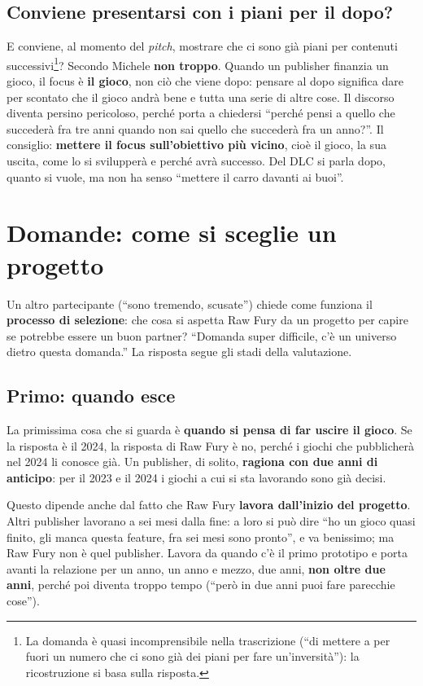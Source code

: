 \subsection{Conviene presentarsi con i piani per il dopo?}

E conviene, al momento del \emph{pitch}, mostrare che ci sono già piani per
contenuti successivi\footnote{La domanda è quasi incomprensibile nella
trascrizione (``di mettere a per fuori un numero che ci sono già dei piani per
fare un'inversità''): la ricostruzione si basa sulla risposta.}? Secondo Michele
\textbf{non troppo}. Quando un publisher finanzia un gioco, il focus è
\textbf{il gioco}, non ciò che viene dopo: pensare al dopo significa dare per
scontato che il gioco andrà bene e tutta una serie di altre cose. Il discorso
diventa persino pericoloso, perché porta a chiedersi ``perché pensi a quello che
succederà fra tre anni quando non sai quello che succederà fra un anno?''. Il
consiglio: \textbf{mettere il focus sull'obiettivo più vicino}, cioè il gioco, la
sua uscita, come lo si svilupperà e perché avrà successo. Del DLC si parla
dopo, quanto si vuole, ma non ha senso ``mettere il carro davanti ai buoi''.

\section{Domande: come si sceglie un progetto}
\label{sec:z4-qa-selezione}

Un altro partecipante (``sono tremendo, scusate'') chiede come funziona il
\textbf{processo di selezione}: che cosa si aspetta Raw Fury da un progetto per
capire se potrebbe essere un buon partner? ``Domanda super difficile, c'è un
universo dietro questa domanda.'' La risposta segue gli stadi della valutazione.

\subsection{Primo: quando esce}

La primissima cosa che si guarda è \textbf{quando si pensa di far uscire il
gioco}. Se la risposta è il 2024, la risposta di Raw Fury è no, perché i giochi
che pubblicherà nel 2024 li conosce già. Un publisher, di solito,
\textbf{ragiona con due anni di anticipo}: per il 2023 e il 2024 i giochi a cui
si sta lavorando sono già decisi.

Questo dipende anche dal fatto che Raw Fury \textbf{lavora dall'inizio del
progetto}. Altri publisher lavorano a sei mesi dalla fine: a loro si può dire
``ho un gioco quasi finito, gli manca questa feature, fra sei mesi sono pronto'',
e va benissimo; ma Raw Fury non è quel publisher. Lavora da quando c'è il primo
prototipo e porta avanti la relazione per un anno, un anno e mezzo, due anni,
\textbf{non oltre due anni}, perché poi diventa troppo tempo (``però in due anni
puoi fare parecchie cose'').

